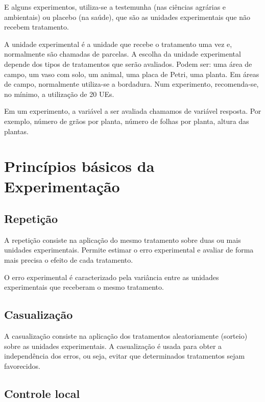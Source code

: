 \documentclass[12pt,brazil,oneside]{book}
\begin{document}
E alguns experimentos, utiliza-se a testemunha (nas ciências agrárias e ambientais) ou placebo (na saúde), que são as unidades experimentais que não recebem tratamento.

A unidade experimental é a unidade que recebe o tratamento uma vez e, normalmente são chamadas de parcelas. A escolha da unidade experimental depende dos tipos de tratamentos que serão avaliados. Podem ser: uma área de campo, um vaso com solo, um animal, uma placa de Petri, uma planta. Em áreas de campo, normalmente utiliza-se a bordadura. Num experimento, recomenda-se, no mínimo, a utilização de 20 UEs.

Em um experimento, a variável a ser avaliada chamamos de variável resposta. Por exemplo, número de grãos por planta, número de folhas por planta, altura das plantas.

\hypertarget{principios-basicos-da-experimentacao}{%
\section{Princípios básicos da Experimentação}\label{principios-basicos-da-experimentacao}}

\hypertarget{repeticao}{%
\subsection{Repetição}\label{repeticao}}

A repetição consiste na aplicação do mesmo tratamento sobre duas ou mais unidades experimentais. Permite estimar o erro experimental e avaliar de forma mais precisa o efeito de
cada tratamento.

O erro experimental é caracterizado pela variância entre as unidades experimentais que receberam o mesmo tratamento.

\hypertarget{casualizacao}{%
\subsection{Casualização}\label{casualizacao}}

A casualização consiste na aplicação dos tratamentos aleatoriamente (sorteio) sobre as unidades experimentais. A casualização é usada para obter a independência dos erros, ou seja, evitar que determinados tratamentos sejam favorecidos.

\hypertarget{controle-local}{%
\subsection{Controle local}\label{controle-local}}
\end{document}
